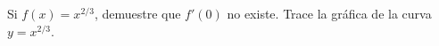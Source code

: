 \item Si $f(x) = x^{2/3}$, demuestre que $f'(0)$ no existe. Trace la gráfica de la curva $y = x^{2/3}$.
